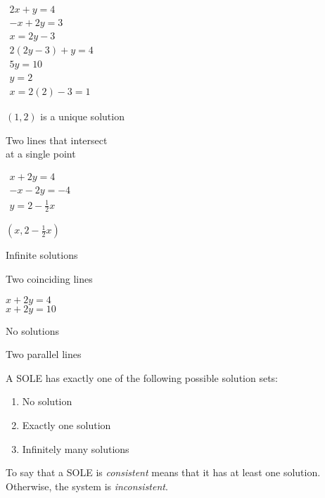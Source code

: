 \documentclass[letterpaper,12pt,fleqn]{article}
\begin{document}
\begin{example}
  \begin{minipage}[t]{2in}
    \vspace{0pt}
    $\begin{array}{l}
      2x+y=4 \\
      -x+2y=3 \\
      \hline
      x=2y-3 \\
      2(2y-3)+y=4 \\
      5y=10 \\
      y=2 \\
      x=2(2)-3=1
    \end{array}$

    \bigskip

    $(1,2)$ is a unique solution
    
    \bigskip

    Two lines that intersect \\
    at a single point
  \end{minipage}
  \begin{minipage}[t]{2in}
    \vspace{0pt}
    $\begin{array}{l}
      x+2y=4 \\
      -x-2y=-4 \\
      \hline
      y=2-\frac{1}{2}x
    \end{array}$

    \bigskip

    $(x,2-\frac{1}{2}x)$

    Infinite solutions

    \bigskip

    Two coinciding lines
  \end{minipage}
  \begin{minipage}[t]{2in}
    \vspace{0pt}
    $x+2y=4$ \\
    $x+2y=10$

    \bigskip

    No solutions

    Two parallel lines
  \end{minipage}
\end{example}

\begin{theorem}
  A SOLE has exactly one of the following possible solution sets:
  \begin{enumerate}
  \item No solution
  \item Exactly one solution
  \item Infinitely many solutions
  \end{enumerate}
\end{theorem}

\begin{definition}
  To say that a SOLE is \emph{consistent} means that it has at least one
  solution. Otherwise, the system is \emph{inconsistent}.
\end{definition}
\end{document}
